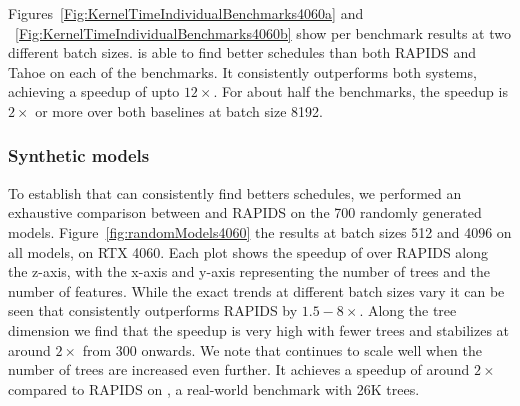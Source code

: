

Figures~\ref{Fig:KernelTimeIndividualBenchmarks4060a} and ~\ref{Fig:KernelTimeIndividualBenchmarks4060b} 
show per benchmark results at two different batch sizes. 
\Treebeard{} is able to find better schedules than both RAPIDS and Tahoe on each of the benchmarks. It consistently
outperforms both systems, achieving a speedup of upto $12\times$.
For about half the benchmarks, the speedup is $2\times$ or more over both baselines at batch size 8192.
\subsubsection*{Synthetic models}
To establish that \Treebeard{} can consistently find betters schedules, we performed an exhaustive comparison between \Treebeard{} and RAPIDS on the 700 randomly generated models.   
Figure~\ref{fig:randomModels4060} the results at batch sizes 512 and 4096 on all models, on RTX 4060. 
Each plot shows the speedup of \Treebeard{} over RAPIDS along the z-axis, with the x-axis and y-axis representing the number of trees and the number of features. 
While the exact trends at different batch sizes vary it can be seen that \Treebeard{} consistently outperforms RAPIDS by $1.5-8\times$. Along the tree 
dimension we find that the speedup is very high with fewer trees and stabilizes at around $2\times$ from 300 onwards. We note that \Treebeard{} continues to scale well 
when the number of trees are increased even further. It achieves a speedup of around $2\times$ compared to RAPIDS on , a real-world benchmark
with 26K trees.

